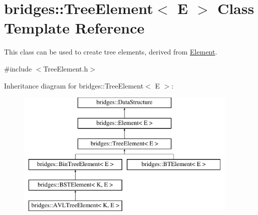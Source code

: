 \hypertarget{classbridges_1_1_tree_element}{}\section{bridges\+:\+:Tree\+Element$<$ E $>$ Class Template Reference}
\label{classbridges_1_1_tree_element}


This class can be used to create tree elements, derived from \hyperlink{classbridges_1_1_element}{Element}.  




{\ttfamily \#include $<$Tree\+Element.\+h$>$}

Inheritance diagram for bridges\+:\+:Tree\+Element$<$ E $>$\+:\begin{figure}[H]
\begin{center}
\leavevmode
\includegraphics[height=6.000000cm]{classbridges_1_1_tree_element}
\end{center}
\end{figure}
